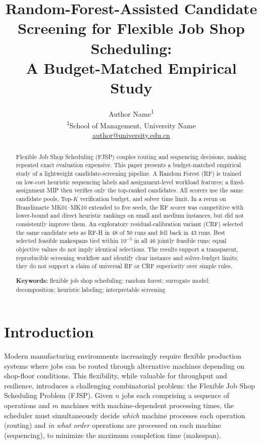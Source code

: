 \documentclass[12pt]{article}
\title{Random-Forest-Assisted Candidate Screening for Flexible Job Shop Scheduling:\\A Budget-Matched Empirical Study}
\author{Author Name\textsuperscript{1}\\\textsuperscript{1}School of Management, University Name\\\href{mailto:author@university.edu.cn}{author@university.edu.cn}}
\date{}
\begin{document}
\maketitle

\begin{abstract}
Flexible Job Shop Scheduling (FJSP) couples routing and sequencing decisions, making repeated exact evaluation expensive. This paper presents a budget-matched empirical study of a lightweight candidate-screening pipeline. A Random Forest (RF) is trained on low-cost heuristic sequencing labels and assignment-level workload features; a fixed-assignment MIP then verifies only the top-ranked candidates. All scorers use the same candidate pools, Top-$K$ verification budget, and solver time limit. In a rerun on Brandimarte MK01--MK10 extended to five seeds, the RF scorer was competitive with lower-bound and direct heuristic rankings on small and medium instances, but did not consistently improve them. An exploratory residual-calibration variant (CRF) selected the same candidate sets as RF-H in 48 of 50 runs and fell back in 43 runs. Best selected feasible makespans tied within $10^{-3}$ in all 46 jointly feasible runs; equal objective values do not imply identical selections. The results support a transparent, reproducible screening workflow and identify clear instance and solver-budget limits; they do not support a claim of universal RF or CRF superiority over simple rules.

\smallskip\noindent\textbf{Keywords:} flexible job shop scheduling; random forest; surrogate model; decomposition; heuristic labeling; interpretable screening
\end{abstract}

\section{Introduction}

Modern manufacturing environments increasingly require flexible production systems where jobs can be routed through alternative machines depending on shop-floor conditions. This flexibility, while valuable for throughput and resilience, introduces a challenging combinatorial problem: the Flexible Job Shop Scheduling Problem (FJSP). Given $n$ jobs each comprising a sequence of operations and $m$ machines with machine-dependent processing times, the scheduler must simultaneously decide \emph{which} machine processes each operation (routing) and \emph{in what order} operations are processed on each machine (sequencing), to minimize the maximum completion time (makespan).
\end{document}
